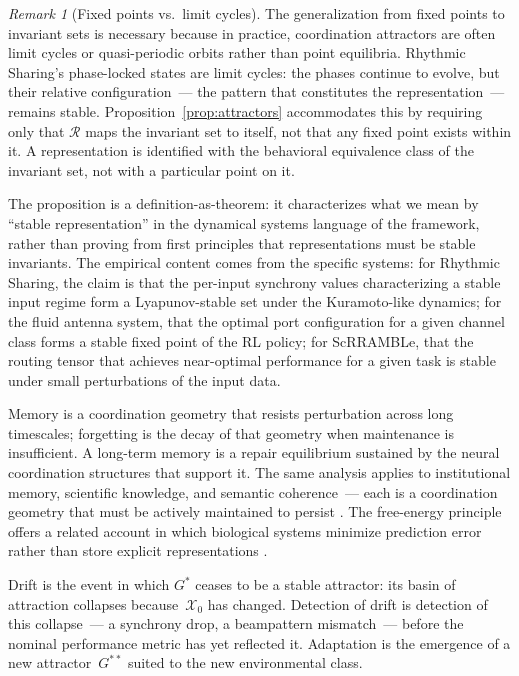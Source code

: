\documentclass[11pt, a4paper]{article}
\theoremstyle{definition}
\theoremstyle{remark}
\newtheorem{remark}{Remark}
\begin{document}
\begin{remark}[Fixed points vs.\ limit cycles]
The generalization from fixed points to invariant sets is necessary because
in practice, coordination attractors are often limit cycles or quasi-periodic
orbits rather than point equilibria. Rhythmic Sharing's phase-locked states
are limit cycles: the phases continue to evolve, but their relative
configuration~--- the pattern that constitutes the representation~---
remains stable. Proposition~\ref{prop:attractors} accommodates this by
requiring only that $\mathcal{R}$ maps the invariant set to itself, not
that any fixed point exists within it. A representation is identified with
the behavioral equivalence class of the invariant set, not with a
particular point on it.

The proposition is a definition-as-theorem: it characterizes what we mean
by ``stable representation'' in the dynamical systems language of the
framework, rather than proving from first principles that representations
must be stable invariants. The empirical content comes from the specific
systems: for Rhythmic Sharing, the claim is that the per-input synchrony
values characterizing a stable input regime form a Lyapunov-stable set
under the Kuramoto-like dynamics; for the fluid antenna system, that the
optimal port configuration for a given channel class forms a stable fixed
point of the RL policy; for ScRRAMBLe, that the routing tensor that
achieves near-optimal performance for a given task is stable under small
perturbations of the input data.
\end{remark}

Memory is a coordination geometry that resists perturbation across long
timescales; forgetting is the decay of that geometry when maintenance is
insufficient. A long-term memory is a repair equilibrium sustained by the
neural coordination structures that support it. The same analysis applies to
institutional memory, scientific knowledge, and semantic coherence~--- each
is a coordination geometry that must be actively maintained to persist
\cite{ashby1956, holland1995}. The free-energy principle offers a related
account in which biological systems minimize prediction error rather than
store explicit representations \cite{friston2010}.

Drift is the event in which $G^*$ ceases to be a stable attractor: its
basin of attraction collapses because~$\mathcal{X}_0$ has changed. Detection
of drift is detection of this collapse~--- a synchrony drop, a beampattern
mismatch~--- before the nominal performance metric has yet reflected it.
Adaptation is the emergence of a new attractor~$G^{**}$ suited to the new
environmental class.
\end{document}
